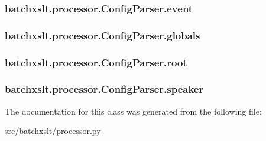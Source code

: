 \subsubsection[{event}]{\setlength{\rightskip}{0pt plus 5cm}batchxslt.\+processor.\+Config\+Parser.\+event}\label{classbatchxslt_1_1processor_1_1_config_parser_a6cb407c9623a9dd4d99dda4f4cf34ed1}
\hypertarget{classbatchxslt_1_1processor_1_1_config_parser_a745f2e03e5bc801d7e0b9ed6aa2f0f5c}{}
\subsubsection[{globals}]{\setlength{\rightskip}{0pt plus 5cm}batchxslt.\+processor.\+Config\+Parser.\+globals}\label{classbatchxslt_1_1processor_1_1_config_parser_a745f2e03e5bc801d7e0b9ed6aa2f0f5c}
\hypertarget{classbatchxslt_1_1processor_1_1_config_parser_aeb567c2af7ed7f776ea37ed2362cf8e6}{}
\subsubsection[{root}]{\setlength{\rightskip}{0pt plus 5cm}batchxslt.\+processor.\+Config\+Parser.\+root}\label{classbatchxslt_1_1processor_1_1_config_parser_aeb567c2af7ed7f776ea37ed2362cf8e6}
\hypertarget{classbatchxslt_1_1processor_1_1_config_parser_aede8c0123de49a137e9fe93010c01f1d}{}
\subsubsection[{speaker}]{\setlength{\rightskip}{0pt plus 5cm}batchxslt.\+processor.\+Config\+Parser.\+speaker}\label{classbatchxslt_1_1processor_1_1_config_parser_aede8c0123de49a137e9fe93010c01f1d}


The documentation for this class was generated from the following file\+:\begin{DoxyCompactItemize}
\item 
src/batchxslt/\hyperlink{processor_8py}{processor.\+py}\end{DoxyCompactItemize}
